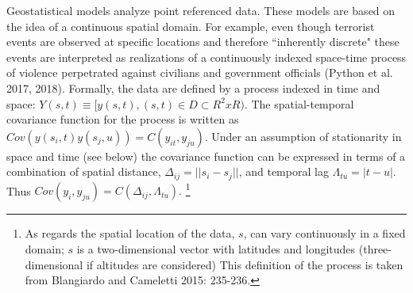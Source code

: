\documentclass[12pt]{article}
\begin{document}
Geostatistical models analyze point referenced data. These models are based on the idea of a
continuous spatial domain. For example, even though terrorist events are observed at specific
locations and therefore ``inherently discrete" these events are interpreted as realizations of
a continuously indexed space-time process of violence perpetrated against civilians and
government officials (Python et al. 2017, 2018). Formally, the data are defined by a
process indexed in time and space:
$Y(s,t) \equiv [y(s,t), (s,t) \in D \subset R^2 x R)$. The spatial-temporal covariance function
for the process is written as $Cov(y(s_i,t)y(s_j,u)) = C(y_{it},y_{ju})$. Under an assumption
of stationarity in space and time (see below) the covariance function can be expressed in terms of a combination
of spatial distance, $\Delta_{ij} = ||s_i - s_j||$, and temporal lag $\Lambda_{tu} = |t-u|$.
Thus $Cov(y_{i},y_{ju}) =
 C(\Delta_{ij}, \Lambda_{tu}).$ \footnote{As regards the spatial location of the data,
 $s$, can vary continuously in a fixed domain;
 $s$ is a two-dimensional vector with latitudes and longitudes (three-dimensional if
 altitudes are considered) This definition of the process is taken from Blangiardo
 and Cameletti 2015: 235-236.}
\end{document}
